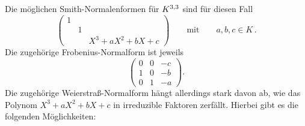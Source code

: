 Die möglichen Smith-Normalenformen für $\matrices{3}{K}$ sind für diesen Fall
\[
  \begin{pmatrix}
    1 &   &                       \\
      & 1 &                       \\
      &   & X^3 + a X^2 + b X + c
  \end{pmatrix}
  \qquad\text{mit}\qquad
  a, b, c \in K \,.
\]
Die zugehörige Frobenius-Normalform ist jeweils
\[
  \begin{pmatrix}
    0 & 0 & -c  \\
    1 & 0 & -b  \\
    0 & 1 & -a
  \end{pmatrix}.
\]
Die zugehörige Weierstraß-Normalform hängt allerdings stark davon ab, wie das Polynom $X^3 + a X^2 + b X + c$ in irreduzible Faktoren zerfällt.
Hierbei gibt es die folgenden Möglichkeiten:

